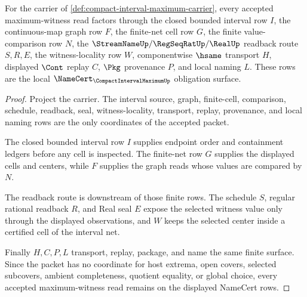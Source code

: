 \begin{theorem}
\label{thm:compact-interval-maximum-finite-witness-obligations}
For the carrier of \autoref{def:compact-interval-maximum-carrier}, every accepted maximum-witness read factors through the closed bounded interval row $I$, the continuous-map graph row $F$, the finite-net cell row $G$, the finite value-comparison row $N$, the $\StreamNameUp/\RegSeqRatUp/\RealUp$ readback route $S,R,E$, the witness-locality row $W$, componentwise $\hsame$ transport $H$, displayed $\Cont$ replay $C$, $\Pkg$ provenance $P$, and local naming $L$. These rows are the local $\NameCert_{\CompactIntervalMaximumUp}$ obligation surface.
\end{theorem}
\begin{proof}
Project the carrier. The interval source, graph, finite-cell, comparison, schedule, readback, seal, witness-locality, transport, replay, provenance, and local naming rows are the only coordinates of the accepted packet.

The closed bounded interval row $I$ supplies endpoint order and containment ledgers before any cell is inspected. The finite-net row $G$ supplies the displayed cells and centers, while $F$ supplies the graph reads whose values are compared by $N$.

The readback route is downstream of those finite rows. The schedule $S$, regular rational readback $R$, and Real seal $E$ expose the selected witness value only through the displayed observations, and $W$ keeps the selected center inside a certified cell of the interval net.

Finally $H,C,P,L$ transport, replay, package, and name the same finite surface. Since the packet has no coordinate for host extrema, open covers, selected subcovers, ambient completeness, quotient equality, or global choice, every accepted maximum-witness read remains on the displayed NameCert rows.
\end{proof}



